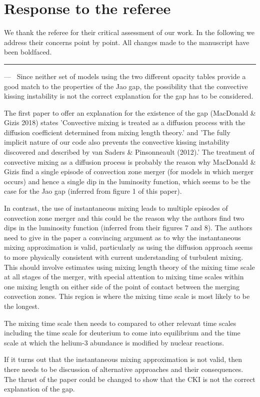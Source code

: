 \documentclass[11pt]{article}
\newcounter{reviewer}
\newcounter{point}[reviewer]
\renewcommand{\thepoint}{\arabic{point})}
\newenvironment{point}
   {\refstepcounter{point} \bigskip \noindent {\textbf{Referee~Point~\thepoint} } ---\ }
   {\par }
\begin{document}
\section*{Response to the referee}
We thank the referee for their critical assessment of our work. In the
following we address their concerns point by point. All changes made to the
manuscript have been boldfaced. 

\hrule
\begin{point}
	Since neither set of models using the two different opacity tables provide a
	good match to the properties of the Jao gap, the possibility that the
	convective kissing instability is not the correct explanation for the gap
	has to be considered.

	The first paper to offer an explanation for the existence of the gap (MacDonald
	\& Gizis 2018) states 'Convective mixing is treated as a diffusion process
	with the diffusion coefficient determined from mixing length theory.' and
	'The fully implicit nature of our code also prevents the convective kissing
	instability discovered and described by van Saders \& Pinsonneault (2012).'
	The treatment of convective mixing as a diffusion process is probably the
	reason why MacDonald \& Gizis find a single episode of convection zone
	merger (for models in which merger occurs) and hence a single dip in the
	luminosity function, which seems to be the case for the Jao gap (inferred
	from figure 1 of this paper).

	In contrast, the use of instantaneous mixing leads to multiple episodes of
	convection zone merger and this could be the reason why the authors find
	two dips in the luminosity function (inferred from their figures 7 and 8).
	The authors need to give in the paper a convincing argument as to why the
	instantaneous mixing approximation is valid, particularly as using the
	diffusion approach seems to more physically consistent with current
	understanding of turbulent mixing. This should involve estimates using
	mixing length theory of the mixing time scale at all stages of the merger,
	with special attention to mixing time scales within one mixing length on
	either side of the point of contact between the merging convection zones.
	This region is where the mixing time scale is most likely to be the
	longest.

	The mixing time scale then needs to compared to other relevant time scales
	including the time scale for deuterium to come into equilibrium and the
	time scale at which the helium-3 abundance is modified by nuclear
	reactions.

	If it turns out that the instantaneous mixing approximation is not valid, then
	there needs to be discussion of alternative approaches and their
	consequences. The thrust of the paper could be changed to show that the CKI
	is not the correct explanation of the gap.
\label{pt:timescale}
\end{point}
\end{document}
